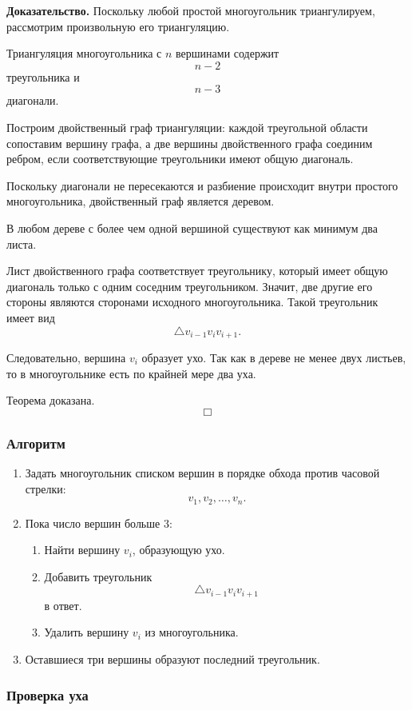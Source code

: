 \documentclass[12pt,a4paper]{article}
\begin{document}
\textbf{Доказательство.}
Поскольку любой простой многоугольник триангулируем, рассмотрим произвольную его триангуляцию.

Триангуляция многоугольника с \(n\) вершинами содержит
\[
n-2
\]
треугольника и
\[
n-3
\]
диагонали.

Построим двойственный граф триангуляции: каждой треугольной области сопоставим вершину графа, а две вершины двойственного графа соединим ребром, если соответствующие треугольники имеют общую диагональ.

Поскольку диагонали не пересекаются и разбиение происходит внутри простого многоугольника, двойственный граф является деревом.

В любом дереве с более чем одной вершиной существуют как минимум два листа.

Лист двойственного графа соответствует треугольнику, который имеет общую диагональ только с одним соседним треугольником. Значит, две другие его стороны являются сторонами исходного многоугольника. Такой треугольник имеет вид
\[
\triangle v_{i-1}v_iv_{i+1}.
\]

Следовательно, вершина \(v_i\) образует ухо. Так как в дереве не менее двух листьев, то в многоугольнике есть по крайней мере два уха.

Теорема доказана.
\[
\Box
\]

\subsubsection{Алгоритм}

\begin{enumerate}
    \item Задать многоугольник списком вершин в порядке обхода против часовой стрелки:
    \[
    v_1,v_2,\dots,v_n.
    \]
    \item Пока число вершин больше \(3\):
    \begin{enumerate}
        \item Найти вершину \(v_i\), образующую ухо.
        \item Добавить треугольник
        \[
        \triangle v_{i-1}v_iv_{i+1}
        \]
        в ответ.
        \item Удалить вершину \(v_i\) из многоугольника.
    \end{enumerate}
    \item Оставшиеся три вершины образуют последний треугольник.
\end{enumerate}

\subsubsection{Проверка уха}
\end{document}
